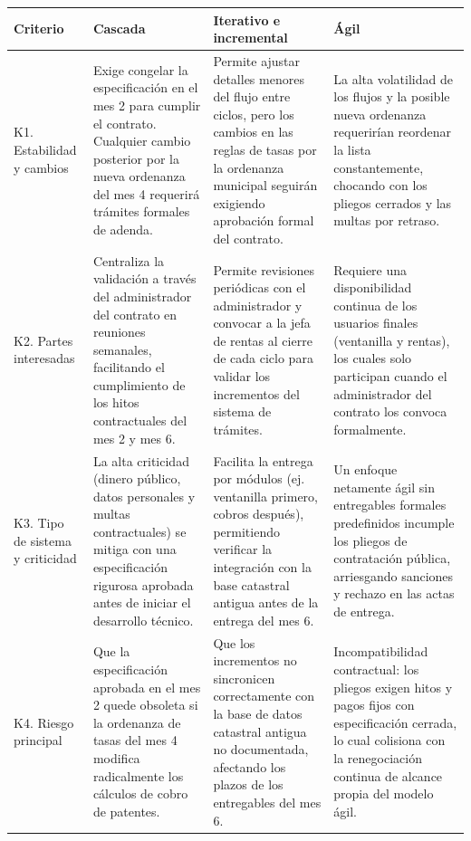 \documentclass[11pt,a4paper]{article}
\begin{document}
\begingroup
\small
\setlength{\tabcolsep}{4pt}
\begin{xltabular}{\textwidth}{|p{0.17\textwidth}|X|X|X|}
\hline
{}
\textbf{Criterio} & \textbf{Cascada} &
\textbf{Iterativo e incremental} & \textbf{Ágil} \\ \hline
\endhead

K1. Estabilidad y cambios &
Exige congelar la especificación en el mes 2 para cumplir el contrato. Cualquier cambio posterior por la nueva ordenanza del mes 4 requerirá trámites formales de adenda. &
Permite ajustar detalles menores del flujo entre ciclos, pero los cambios en las reglas de tasas por la ordenanza municipal seguirán exigiendo aprobación formal del contrato. &
La alta volatilidad de los flujos y la posible nueva ordenanza requerirían reordenar la lista constantemente, chocando con los pliegos cerrados y las multas por retraso.
\\ \hline

K2. Partes interesadas &
Centraliza la validación a través del administrador del contrato en reuniones semanales, facilitando el cumplimiento de los hitos contractuales del mes 2 y mes 6. &
Permite revisiones periódicas con el administrador y convocar a la jefa de rentas al cierre de cada ciclo para validar los incrementos del sistema de trámites. &
Requiere una disponibilidad continua de los usuarios finales (ventanilla y rentas), los cuales solo participan cuando el administrador del contrato los convoca formalmente.
\\ \hline

K3. Tipo de sistema y criticidad &
La alta criticidad (dinero público, datos personales y multas contractuales) se mitiga con una especificación rigurosa aprobada antes de iniciar el desarrollo técnico. &
Facilita la entrega por módulos (ej. ventanilla primero, cobros después), permitiendo verificar la integración con la base catastral antigua antes de la entrega del mes 6. &
Un enfoque netamente ágil sin entregables formales predefinidos incumple los pliegos de contratación pública, arriesgando sanciones y rechazo en las actas de entrega.
\\ \hline

K4. Riesgo principal &
Que la especificación aprobada en el mes 2 quede obsoleta si la ordenanza de tasas del mes 4 modifica radicalmente los cálculos de cobro de patentes. &
Que los incrementos no sincronicen correctamente con la base de datos catastral antigua no documentada, afectando los plazos de los entregables del mes 6. &
Incompatibilidad contractual: los pliegos exigen hitos y pagos fijos con especificación cerrada, lo cual colisiona con la renegociación continua de alcance propia del modelo ágil.
\\ \hline


\end{xltabular}
\end{document}
